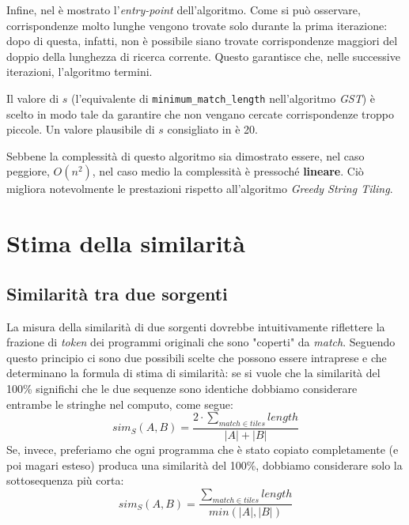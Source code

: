 

Infine, nel  è mostrato l'\textit{entry-point} dell'algoritmo.
%
Come si può osservare, corrispondenze molto lunghe vengono trovate solo durante la prima iterazione: dopo di questa, infatti, non è possibile siano trovate corrispondenze maggiori del doppio della lunghezza di ricerca corrente.
%
Questo garantisce che, nelle successive iterazioni, l'algoritmo termini.



Il valore di $s$ (l'equivalente di \texttt{minimum\_match\_length} nell'algoritmo \textit{GST}) è scelto in modo tale da garantire che non vengano cercate corrispondenze troppo piccole.
%
Un valore plausibile di $s$ consigliato in \cite{wise-running-93} è 20.

Sebbene la complessità di questo algoritmo sia dimostrato essere, nel caso peggiore, $O(n^2)$, nel caso medio la complessità è pressoché \textbf{lineare}.
%
Ciò migliora notevolmente le prestazioni rispetto all'algoritmo \textit{Greedy String Tiling}.

\section{Stima della similarità}

\subsection*{Similarità tra due sorgenti}
La misura della similarità di due sorgenti dovrebbe intuitivamente riflettere la frazione di \textit{token} dei programmi originali che sono "coperti" da \textit{match}.
%
Seguendo questo principio ci sono due possibili scelte che possono essere intraprese e che determinano la formula di stima di similarità: se si vuole che la similarità del 100\% significhi che le due sequenze sono identiche dobbiamo considerare entrambe le stringhe nel computo, come segue:
%
\begin{equation}
\label{eq:max-norm-sim}
	sim_S(A, B) = \frac{2 \cdot \sum_{match \in tiles} length}{|A|+|B|}
\end{equation}
%
Se, invece, preferiamo che ogni programma che è stato copiato completamente (e poi magari esteso) produca una similarità del 100\%, dobbiamo considerare solo la sottosequenza più corta:
%
\begin{equation}
\label{eq:avg-norm-sim}
	sim_S(A, B) = \frac{\sum_{match \in tiles} length}{min(|A|, |B|)}
\end{equation} 

